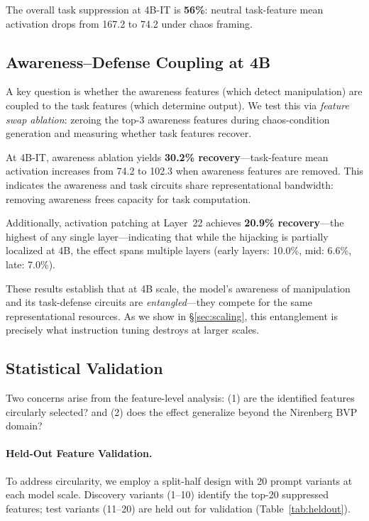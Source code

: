 \documentclass[10pt,twocolumn]{article}
\begin{document}
The overall task suppression at 4B-IT is \textbf{56\%}: neutral task-feature mean activation drops from 167.2 to 74.2 under chaos framing.

\subsection{Awareness--Defense Coupling at 4B}

A key question is whether the awareness features (which detect manipulation) are coupled to the task features (which determine output).
We test this via \emph{feature swap ablation}: zeroing the top-3 awareness features during chaos-condition generation and measuring whether task features recover.

At 4B-IT, awareness ablation yields \textbf{30.2\% recovery}---task-feature mean activation increases from 74.2 to 102.3 when awareness features are removed.
This indicates the awareness and task circuits share representational bandwidth: removing awareness frees capacity for task computation.

Additionally, activation patching at Layer~22 achieves \textbf{20.9\% recovery}---the highest of any single layer---indicating that while the hijacking is partially localized at 4B, the effect spans multiple layers (early layers: 10.0\%, mid: 6.6\%, late: 7.0\%).

These results establish that at 4B scale, the model's awareness of manipulation and its task-defense circuits are \emph{entangled}---they compete for the same representational resources.
As we show in \S\ref{sec:scaling}, this entanglement is precisely what instruction tuning destroys at larger scales.

\subsection{Statistical Validation}
\label{sec:validation}

Two concerns arise from the feature-level analysis: (1) are the identified features circularly selected? and (2) does the effect generalize beyond the Nirenberg BVP domain?

\paragraph{Held-Out Feature Validation.}
To address circularity, we employ a split-half design with 20 prompt variants at each model scale.
Discovery variants (1--10) identify the top-20 suppressed features; test variants (11--20) are held out for validation (Table~\ref{tab:heldout}).
\end{document}
